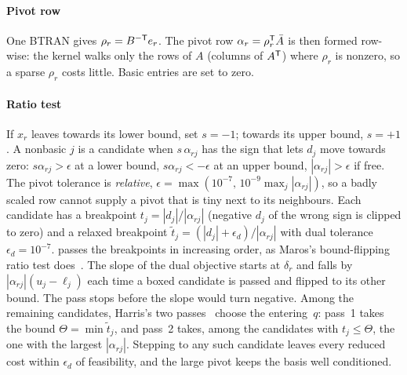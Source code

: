 \paragraph{Pivot row}
One BTRAN gives $\rho_r=B^{-\mathsf{T}} e_r$. The pivot row $\alpha_r=\rho_r^{\mathsf{T}}\bar A$ is then formed row-wise: the
kernel walks only the rows of $A$ (columns of $A^{\mathsf{T}}$) where $\rho_r$ is nonzero, so a sparse $\rho_r$
costs little. Basic entries are set to zero.

\paragraph{Ratio test}
If $x_r$ leaves towards its lower bound, set $s=-1$; towards its upper bound, $s=+1$. A nonbasic $j$ is
a candidate when $s\,\alpha_{rj}$ has the sign that lets $d_j$ move towards zero: $s\alpha_{rj}>\epsilon$
at a lower bound, $s\alpha_{rj}<-\epsilon$ at an upper bound, $|\alpha_{rj}|>\epsilon$ if free. The
pivot tolerance is \emph{relative}, $\epsilon=\max(10^{-7},\,10^{-9}\max_j|\alpha_{rj}|)$, so a
badly scaled row cannot supply a pivot that is tiny next to its neighbours. Each candidate has a
breakpoint $t_j=|d_j|/|\alpha_{rj}|$ (negative $d_j$ of the wrong sign is clipped to zero) and a
relaxed breakpoint $\tilde t_j=(|d_j|+\epsilon_d)/|\alpha_{rj}|$ with dual tolerance
$\epsilon_d=10^{-7}$.  passes the breakpoints in increasing order, as
Maros's bound-flipping ratio test does~\cite{maros2003}. The slope of the dual objective starts at
$\delta_r$ and falls by $|\alpha_{rj}|(u_j-\ell_j)$ each time a boxed candidate is passed and flipped
to its other bound. The pass stops before the slope would turn negative. Among the remaining
candidates, Harris's two passes~\cite{harris1973} choose the entering~$q$: pass~1 takes the bound
$\Theta=\min\tilde t_j$, and pass~2 takes, among the candidates with $t_j\le\Theta$, the one with the
largest $|\alpha_{rj}|$. Stepping to any such candidate leaves every reduced cost within $\epsilon_d$
of feasibility, and the large pivot keeps the basis well conditioned.

